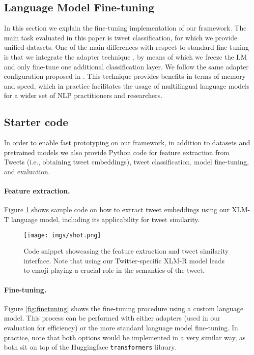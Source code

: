 \documentclass[10pt, a4paper]{article}
\begin{document}
\subsection{Language Model Fine-tuning}
\label{sec:language_model_finetune}

In this section we explain the fine-tuning implementation of our framework. The main task evaluated in this paper is tweet classification, for which we provide unified datasets. One of the main differences with respect to standard fine-tuning is that we integrate the adapter technique \cite{houlsby2019parameter}, by means of which we freeze the LM and only fine-tune one additional classification layer. We follow the same adapter configuration proposed in . This technique provides benefits in terms of memory and speed, which in practice facilitates the usage of multilingual language models for a wider set of NLP practitioners and researchers.









\subsection{Starter code} 
\label{sec:startercode}
In order to enable fast prototyping on our framework, in addition to datasets and pretrained models we also provide Python code for feature extraction from Tweets (i.e., obtaining tweet embeddings), tweet classification, model fine-tuning,  and evaluation.

\paragraph{Feature extraction.} Figure \ref{fig:code} shows sample code on how to extract tweet embeddings using our XLM-T language model, including its applicability for tweet similarity.
    
    \begin{figure}[t]
\texttt{[image: imgs/shot.png]}
\caption{\label{fig:code} Code snippet showcasing the feature extraction and tweet similarity interface. Note that using our Twitter-specific XLM-R model leads to emoji playing a crucial role in the semantics of the tweet.}
\end{figure}
    
    
\paragraph{Fine-tuning.} Figure \ref{fig:finetuning} shows the fine-tuning procedure using a custom language model. This process can be performed with either adapters (used in our evaluation for efficiency) or the more standard language model fine-tuning. In practice, note that both options would be implemented in a very similar way, as both sit on top of the Huggingface \texttt{transformers} library.
    
\end{document}
